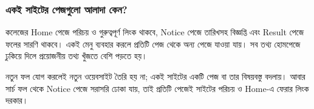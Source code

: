 \subsubsection{একই সাইটের পেজগুলো আলাদা কেন?}
কলেজের Home পেজে পরিচয় ও গুরুত্বপূর্ণ লিংক থাকবে, Notice পেজে তারিখসহ বিজ্ঞপ্তি এবং Result পেজে ফলের সারণি থাকবে। একই মেনু ব্যবহার করলে প্রতিটি পেজ থেকে অন্য পেজে যাওয়া যায়। সব তথ্য হোমপেজে ঢুকিয়ে দিলে প্রয়োজনীয় তথ্য খুঁজতে বেশি পড়তে হয়।

নতুন ফল যোগ করলেই নতুন ওয়েবসাইট তৈরি হয় না; একই সাইটের একটি পেজ বা তার বিষয়বস্তু বদলায়। আবার সার্চ ফল থেকে Notice পেজে সরাসরি ঢোকা যায়, তাই প্রতিটি পেজেই সাইটের পরিচয় ও Home-এ ফেরার লিংক দরকার।
